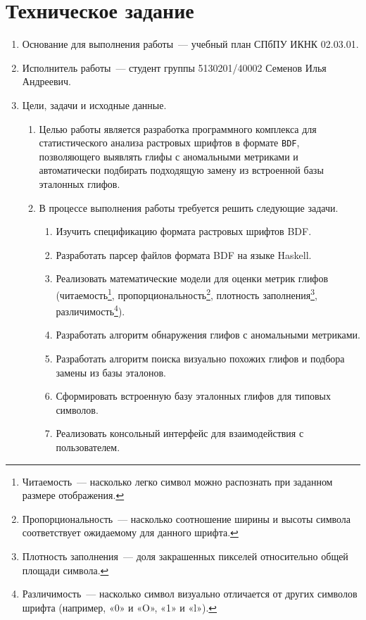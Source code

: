 \section*{Техническое задание}

\begin{enumerate}
    \item Основание для выполнения работы~--- учебный план СПбПУ ИКНК 02.03.01.
    \item Исполнитель работы~--- студент группы 5130201/40002 Семенов Илья Андреевич.
    \item Цели, задачи и исходные данные.
        \begin{enumerate}[label=\alph*.]
            \item Целью работы является разработка программного комплекса для статистического анализа растровых шрифтов в формате \verb|BDF|, позволяющего выявлять глифы с аномальными метриками и автоматически подбирать подходящую замену из встроенной базы эталонных глифов.
            \item В процессе выполнения работы требуется решить следующие задачи.
            \begin{enumerate}
                \item Изучить спецификацию формата растровых шрифтов BDF.
                \item Разработать парсер файлов формата BDF на языке Haskell.
                \item Реализовать математические модели для оценки метрик глифов (читаемость\footnote{Читаемость~--- насколько легко символ можно распознать при заданном размере отображения.}, пропорциональность\footnote{Пропорциональность~--- насколько соотношение ширины и высоты символа соответствует ожидаемому для данного шрифта.}, плотность заполнения\footnote{Плотность заполнения~--- доля закрашенных пикселей относительно общей площади символа.}, различимость\footnote{Различимость~--- насколько символ визуально отличается от других символов шрифта (например, «0» и «O», «1» и «l»).}).
                \item Разработать алгоритм обнаружения глифов с аномальными метриками.
                \item Разработать алгоритм поиска визуально похожих глифов и подбора замены из базы эталонов.
                \item Сформировать встроенную базу эталонных глифов для типовых символов.
                \item Реализовать консольный интерфейс для взаимодействия с пользователем.

\end{enumerate}
\end{enumerate}
\end{enumerate}
